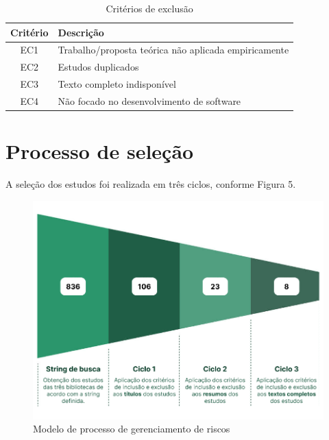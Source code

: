 \documentclass[
	12pt,
	openright,
	twoside,
	a4paper,
	english,
	brazil
	]{abntex2}
\begin{document}
\begin{table}[h!]
  \centering
  \caption{Critérios de exclusão}
  \begin{tabular}{|c|l|}
  \hline
  \textbf{Critério} & \textbf{Descrição} \\ \hline
  EC1 & Trabalho/proposta teórica não aplicada empiricamente \\ \hline
  EC2 & Estudos duplicados \\ \hline
  EC3 & Texto completo indisponível \\ \hline
  EC4 & Não focado no desenvolvimento de software \\ \hline
  \end{tabular}
\end{table}

\section{Processo de seleção}

A seleção dos estudos foi realizada em três ciclos, conforme Figura 5.

\begin{figure}[H]
	\caption{\label{numero-estudos-ciclo}Modelo de processo de gerenciamento de riscos}
  \includegraphics[width=\textwidth]{numero-estudos-ciclo}
\end{figure}
\end{document}
